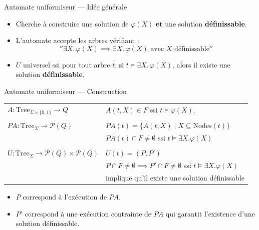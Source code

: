 \documentclass[10pt,xcolor=dvipsnames]{beamer}
\theoremstyle{plain}
\begin{document}
\begin{frame}{Automate uniformiseur — Idée générale}

	\begin{itemize}
		\item Cherche à construire une solution de $\varphi(X)$ \textbf{et} une solution \textbf{définissable}.
		\item L'automate accepte les arbres vérifiant :
		      \[
			      ''\exists X.\, \varphi(X) \implies \exists X.\, \varphi(X) \text{ avec } X \text{ définissable}''
		      \]
		\item $U$ universel ssi pour tout arbre $t$, si $t \models \exists X.\, \varphi(X)$, alors il existe une solution \textbf{définissable}.
	\end{itemize}

\end{frame}

\begin{frame}{Automate uniformiseur — Construction}

	\begin{tabular}{ll}
		\toprule
		$A : \text{Tree}_{\Sigma \times \{0,1\}} \to Q$                     & $A(t,X) \in F$ ssi $t \models \varphi(X)$.                                                             \\
		\\
		$PA : \text{Tree}_{\Sigma} \to \mathcal{P}(Q)$                      & $PA(t) = \{ A(t,X) \mid X \subseteq \text{Nodes}(t) \}$                                                \\
		                                                                    & $PA(t) \cap F \neq \emptyset \text{ ssi } t \models \exists X. \varphi(X)$                             \\
		\midrule
		\\
		$U : \text{Tree}_{\Sigma} \to \mathcal{P}(Q) \times \mathcal{P}(Q)$ & $U(t) = (P,P')$                                                                                        \\
		                                                                    & $P \cap F \neq \emptyset \implies P' \cap F \neq \emptyset$    ssi   $t \models \exists X. \varphi(X)$ \\
		                                                                    & implique qu'il existe une solution définissable                                                        \\
		\bottomrule
	\end{tabular}

	\vspace{1em}

	\begin{itemize}
		\item $P$ correspond à l'exécution de $PA$.
		\item $P'$ correspond à une exécution contrainte de $PA$ qui garantit l'existence d'une solution définissable.
	\end{itemize}

\end{frame}
\end{document}
